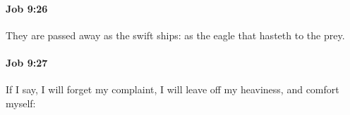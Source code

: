 		\paragraph{Job 9:26} %
			\label{JOB-9-26}

			They are passed away as the swift ships: as the eagle that hasteth to the prey.


		\paragraph{Job 9:27} %
			\label{JOB-9-27}

			If I say, I will forget my complaint, I will leave off my heaviness, and comfort myself:


